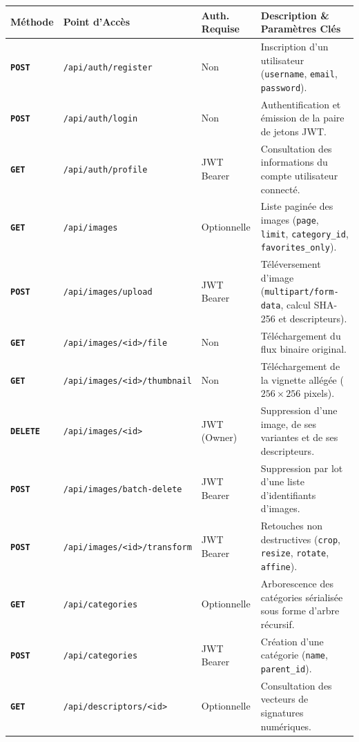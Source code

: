\begin{table}[H]
\centering
{}
\scriptsize
\begin{tabularx}{\textwidth}{>{\bfseries}p{1.4cm}p{3.5cm}p{2.1cm}X}
\toprule
\rowcolor{TableHeader}
\color{white}Méthode & \color{white}Point d'Accès & \color{white}Auth. Requise & \color{white}Description \& Paramètres Clés \\
\midrule
\texttt{POST} & \texttt{/api/auth/register} & Non & Inscription d'un utilisateur (\texttt{username}, \texttt{email}, \texttt{password}). \\
\texttt{POST} & \texttt{/api/auth/login} & Non & Authentification et émission de la paire de jetons JWT. \\
\texttt{GET} & \texttt{/api/auth/profile} & JWT Bearer & Consultation des informations du compte utilisateur connecté. \\
\midrule
\texttt{GET} & \texttt{/api/images} & Optionnelle & Liste paginée des images (\texttt{page}, \texttt{limit}, \texttt{category\_id}, \texttt{favorites\_only}). \\
\texttt{POST} & \texttt{/api/images/upload} & JWT Bearer & Téléversement d'image (\texttt{multipart/form-data}, calcul SHA-256 et descripteurs). \\
\texttt{GET} & \texttt{/api/images/<id>/file} & Non & Téléchargement du flux binaire original. \\
\texttt{GET} & \texttt{/api/images/<id>/thumbnail}& Non & Téléchargement de la vignette allégée ($256 \times 256$ pixels). \\
\texttt{DELETE}& \texttt{/api/images/<id>} & JWT (Owner) & Suppression d'une image, de ses variantes et de ses descripteurs. \\
\texttt{POST} & \texttt{/api/images/batch-delete} & JWT Bearer & Suppression par lot d'une liste d'identifiants d'images. \\
\texttt{POST} & \texttt{/api/images/<id>/transform}& JWT Bearer & Retouches non destructives (\texttt{crop}, \texttt{resize}, \texttt{rotate}, \texttt{affine}). \\
\midrule
\texttt{GET} & \texttt{/api/categories} & Optionnelle & Arborescence des catégories sérialisée sous forme d'arbre récursif. \\
\texttt{POST} & \texttt{/api/categories} & JWT Bearer & Création d'une catégorie (\texttt{name}, \texttt{parent\_id}). \\
\midrule
\texttt{GET} & \texttt{/api/descriptors/<id>} & Optionnelle & Consultation des vecteurs de signatures numériques. \\

\end{tabularx}
\end{table}
